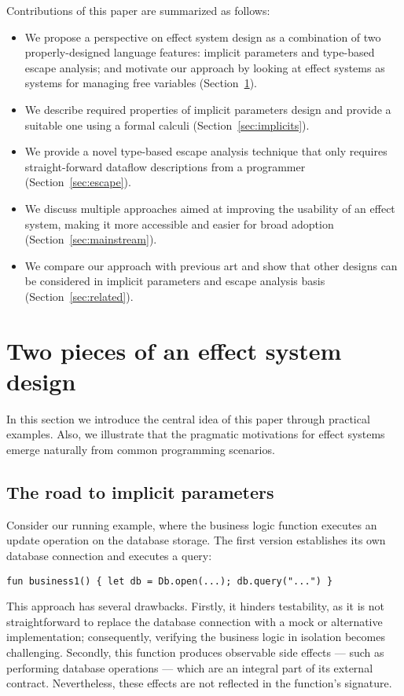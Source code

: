 \documentclass[acmsmall,review,screen]{acmart}
\begin{document}
Contributions of this paper are summarized as follows:
\begin{itemize}
    \item We propose a perspective on effect system design as a combination of two properly-designed language features: implicit parameters and type-based escape analysis; and motivate our approach by looking at effect systems as systems for managing free variables (Section~\ref{sec:idea}).
    \item We describe required properties of implicit parameters design and provide a suitable one using a formal calculi (Section~\ref{sec:implicits}).
    \item We provide a novel type-based escape analysis technique that only requires straight-forward dataflow descriptions from a programmer (Section~\ref{sec:escape}).
    \item We discuss multiple approaches aimed at improving the usability of an effect system, making it more accessible and easier for broad adoption (Section~\ref{sec:mainstream}).
    \item We compare our approach with previous art and show that other designs can be considered in implicit parameters and escape analysis basis (Section~\ref{sec:related}).
\end{itemize}


\section{Two pieces of an effect system design} \label{sec:idea}

In this section we introduce the central idea of this paper through practical examples.
Also, we illustrate that the pragmatic motivations for effect systems emerge naturally from common programming scenarios.

\subsection{The road to implicit parameters} \label{subsec:implicits}

Consider our running example, where the business logic function executes an update operation on the database storage.
The first version establishes its own database connection and executes a query:
\begin{lstlisting}[language=colang]
    fun business1() { let db = Db.open(...); db.query("...") }
\end{lstlisting}
This approach has several drawbacks.
Firstly, it hinders testability, as it is not straightforward to replace the database connection with a mock or alternative implementation; consequently, verifying the business logic in isolation becomes challenging.
Secondly, this function produces observable side effects --- such as performing database operations --- which are an integral part of its external contract.
Nevertheless, these effects are not reflected in the function’s signature.
\end{document}
